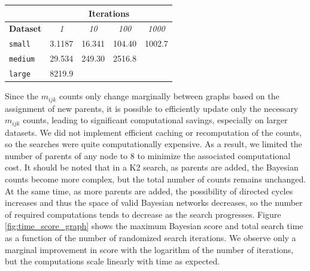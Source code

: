 \documentclass[10pt,letterpaper]{article}
\begin{document}
	\begin{center}
		\vspace*{10pt}
		\label{tab:runtime}
		\begin{tabular}{l|l|l|l|l|}
			\cline{2-5}
			&                                                  \multicolumn{4}{c|}{\textbf{Iterations}}                                                   \\ \hline
			\multicolumn{1}{|l|}{\textbf{Dataset}} & \multicolumn{1}{c|}{\textit{1}} & \multicolumn{1}{c|}{\textit{10}} & \multicolumn{1}{c|}{\textit{100}} & \multicolumn{1}{c|}{\textit{1000}} \\ \hline
			\multicolumn{1}{|l|}{\texttt{small}}   & 3.1187                        & 16.341                         & 104.40                          & 1002.7                           \\ \hline
			\multicolumn{1}{|l|}{\texttt{medium}}  & 29.534                        & 249.30                         & 2516.8                          & \cellcolor[HTML]{EFEFEF}           \\ \hline
			\multicolumn{1}{|l|}{\texttt{large}}   & 8219.9                        & \cellcolor[HTML]{EFEFEF}         & \cellcolor[HTML]{EFEFEF}          & \cellcolor[HTML]{EFEFEF}           \\ \hline
		\end{tabular}
	\end{center}

	\vspace*{0.15 in}
	
	Since the $m_{ijk}$ counts only change marginally between graphs based on the assignment of new parents, it is possible to efficiently update only the necessary $m_{ijk}$ counts, leading to significant computational savings, especially on larger datasets. We did not implement efficient caching or recomputation of the counts, so the searches were quite computationally expensive. As a result, we limited the number of parents of any node to 8 to minimize the associated computational cost. It should be noted that in a K2 search, as parents are added, the Bayesian counts become more complex, but the total number of counts remains unchanged. At the same time, as more parents are added, the possibility of directed cycles increases and thus the space of valid Bayesian networks decreases, so the number of required computations tends to decrease as the search progresses. Figure \ref{fig:time_score_graph} shows the maximum Bayesian score and total search time as a function of the number of randomized search iterations. We observe only a marginal improvement in score with the logarithm of the number of iterations, but the computations scale linearly with time as expected. 
	
\end{document}
